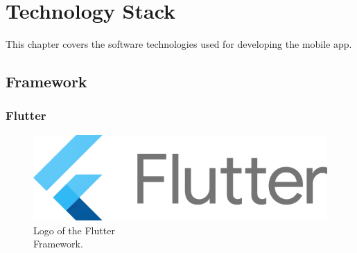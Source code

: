 \section{Technology Stack}
This chapter covers the software technologies used for developing the mobile app.
\subsection{Framework}
\subsubsection{Flutter}

\begin{figure} %
    \centering
    \includegraphics[width=\linewidth]{images/flutter.png}
    \caption{Logo of the Flutter\\Framework.}
\end{figure}


